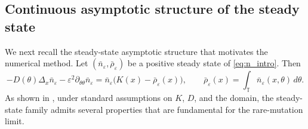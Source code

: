 \documentclass[11pt, dina4, amsfont12]{article}
\begin{document}
\subsection{Continuous asymptotic structure of the steady state}\label{subsec:continuous_asymptotic_structure}

We next recall the steady-state asymptotic structure that motivates the numerical method. Let \((\bar n_\varepsilon,\bar \rho_\varepsilon)\) be a positive steady state of \eqref{eq:n_intro}. Then
\begin{equation}\label{eq:ss_n}
-D(\theta)\Delta_x \bar n_\varepsilon
-\varepsilon^2\partial_{\theta\theta} \bar n_\varepsilon
=
\bar n_\varepsilon\bigl(K(x)-\bar\rho_\varepsilon(x)\bigr),
\qquad
\bar\rho_\varepsilon(x)=\int_{\mathbb T} \bar n_\varepsilon(x,\theta)\,d\theta.
\end{equation}
As shown in \cite{PerthameSouganidis}, under standard assumptions on \(K\), \(D\), and the domain, the steady-state family admits several properties that are fundamental for the rare-mutation limit.
\end{document}
